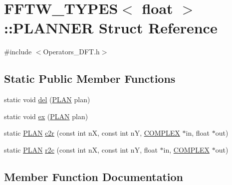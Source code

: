 \hypertarget{struct_f_f_t_w___t_y_p_e_s_3_01float_01_4_1_1_p_l_a_n_n_e_r}{}\section{F\+F\+T\+W\+\_\+\+T\+Y\+P\+E\+S$<$ float $>$\+:\+:P\+L\+A\+N\+N\+E\+R Struct Reference}
\label{struct_f_f_t_w___t_y_p_e_s_3_01float_01_4_1_1_p_l_a_n_n_e_r}


{\ttfamily \#include $<$Operators\+\_\+\+D\+F\+T.\+h$>$}

\subsection*{Static Public Member Functions}
\begin{DoxyCompactItemize}
\item 
static void \hyperlink{struct_f_f_t_w___t_y_p_e_s_3_01float_01_4_1_1_p_l_a_n_n_e_r_a9a6b45f76a73bfbedebfbfff2be272ac}{del} (\hyperlink{struct_f_f_t_w___t_y_p_e_s_3_01float_01_4_a564fe6a699a8574500c81d7d43b23980}{P\+L\+A\+N} plan)
\item 
static void \hyperlink{struct_f_f_t_w___t_y_p_e_s_3_01float_01_4_1_1_p_l_a_n_n_e_r_a1bafc7df21392fde5273d7d23e563716}{ex} (\hyperlink{struct_f_f_t_w___t_y_p_e_s_3_01float_01_4_a564fe6a699a8574500c81d7d43b23980}{P\+L\+A\+N} plan)
\item 
static \hyperlink{struct_f_f_t_w___t_y_p_e_s_3_01float_01_4_a564fe6a699a8574500c81d7d43b23980}{P\+L\+A\+N} \hyperlink{struct_f_f_t_w___t_y_p_e_s_3_01float_01_4_1_1_p_l_a_n_n_e_r_a8e64dbf38472d941792b24ca56101559}{c2r} (const int n\+X, const int n\+Y, \hyperlink{struct_f_f_t_w___t_y_p_e_s_3_01float_01_4_a0039a21dbbd01522d970667b3480a169}{C\+O\+M\+P\+L\+E\+X} $\ast$in, float $\ast$out)
\item 
static \hyperlink{struct_f_f_t_w___t_y_p_e_s_3_01float_01_4_a564fe6a699a8574500c81d7d43b23980}{P\+L\+A\+N} \hyperlink{struct_f_f_t_w___t_y_p_e_s_3_01float_01_4_1_1_p_l_a_n_n_e_r_a6c76c0cdeac243af70ed7c5cfc6a2c3c}{r2c} (const int n\+X, const int n\+Y, float $\ast$in, \hyperlink{struct_f_f_t_w___t_y_p_e_s_3_01float_01_4_a0039a21dbbd01522d970667b3480a169}{C\+O\+M\+P\+L\+E\+X} $\ast$out)
\end{DoxyCompactItemize}


\subsection{Member Function Documentation}
\hypertarget{struct_f_f_t_w___t_y_p_e_s_3_01float_01_4_1_1_p_l_a_n_n_e_r_a8e64dbf38472d941792b24ca56101559}{}
